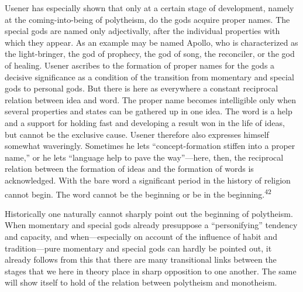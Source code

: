 \documentclass[12pt,a4paper]{book}
\newcommand{\opage}[1]{\marginnote{\footnotesize\textit{[#1]}}}
\begin{document}
Usener has especially shown that only at a certain stage of development, namely at the
coming-into-being of polytheism, do the gods acquire proper names. The special gods are
named only adjectivally, after the individual properties with which they appear. As an
example may be named Apollo, who is characterized as the light-bringer, the god of
prophecy, the god of song, the reconciler, or the god of healing. Usener ascribes to the
formation of proper names for the gods a decisive significance as a condition of the
transition from momentary and special gods to personal gods. But there is here as
everywhere a constant reciprocal relation between idea and word. The proper name becomes
intelligible only when several properties and states can be gathered up in one idea. The
word is a help and a support for holding fast and developing a result won in the life of
ideas, but cannot be 
\opage{95}the exclusive cause. Usener therefore also expresses himself somewhat
waveringly. Sometimes he lets ``concept-formation stiffen into a proper name,'' or he lets
``language help to pave the way''---here, then, the reciprocal relation between the
formation of ideas and the formation of words is acknowledged. With the bare word a
significant period in the history of religion cannot begin. The word cannot be the
beginning or be in the beginning.\textsuperscript{42}

Historically one naturally cannot sharply point out the beginning of polytheism. When
momentary and special gods already presuppose a ``personifying'' tendency and capacity,
and when---especially on account of the influence of habit and tradition---pure momentary
and special gods can hardly be pointed out, it already follows from this that there are
many transitional links between the stages that we here in theory place in sharp opposition
to one another. The same will show itself to hold of the relation between polytheism and
monotheism.

\medskip
\end{document}
